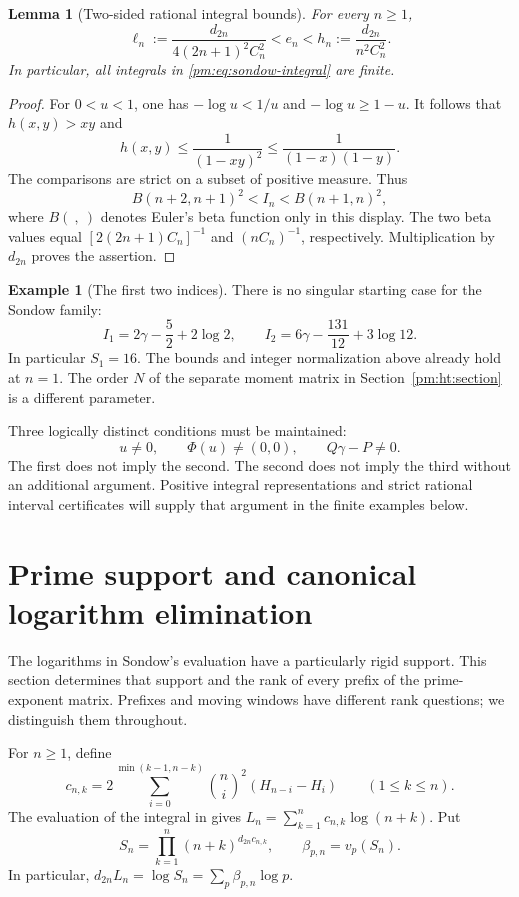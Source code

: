 \documentclass[11pt,a4paper]{article}
\newtheorem{lemma}[theorem]{Lemma}
\theoremstyle{definition}
\newtheorem{example}[theorem]{Example}
\theoremstyle{remark}
\numberwithin{equation}{section}
\begin{document}
\begin{lemma}[Two-sided rational integral bounds]\label{pm:lem:integral-bounds}
For every $n\ge1$,
\begin{equation}\label{pm:eq:two-sided-bounds}
 \ell_n:=\frac{d_{2n}}{4(2n+1)^2C_n^2}
 <e_n<
 h_n:=\frac{d_{2n}}{n^2C_n^2}.
\end{equation}
In particular, all integrals in \eqref{pm:eq:sondow-integral} are finite.
\end{lemma}
\begin{proof}
For $0<u<1$, one has $-\log u<1/u$ and $-\log u\ge1-u$.
It follows that $h(x,y)>xy$ and
\[
 h(x,y)\le\frac1{(1-xy)^2}
 \le\frac1{(1-x)(1-y)}.
\]
The comparisons are strict on a subset of positive measure.  Thus
\[
 B(n+2,n+1)^2<I_n<B(n+1,n)^2,
\]
where $B(\ ,\ )$ denotes Euler's beta function only in this display.
The two beta values equal $[2(2n+1)C_n]^{-1}$ and $(nC_n)^{-1}$,
respectively.  Multiplication by $d_{2n}$ proves the assertion.
\end{proof}

\begin{example}[The first two indices]
There is no singular starting case for the Sondow family:
\[
 I_1=2\gamma-\frac52+2\log2,\qquad
 I_2=6\gamma-\frac{131}{12}+3\log12.
\]
In particular $S_1=16$.  The bounds and integer normalization above
already hold at $n=1$.  The order $N$ of the separate moment matrix in
Section~\ref{pm:ht:section} is a different parameter.
\end{example}

Three logically distinct conditions must be maintained:
\[
 u\ne0,\qquad \Phi(u)\ne(0,0),\qquad Q\gamma-P\ne0.
\]
The first does not imply the second.  The second does not imply the third
without an additional argument.  Positive integral representations and
strict rational interval certificates will supply that argument in the
finite examples below.


\section{Prime support and canonical logarithm elimination}
\label{pm:str:sec-primes}

The logarithms in Sondow's evaluation have a particularly rigid support.
This section determines that support and the rank of every prefix of the
prime-exponent matrix.  Prefixes and moving windows have different rank
questions; we distinguish them throughout.

For $n\geq1$, define
\begin{equation}\label{pm:str:def-c}
 c_{n,k}=2\sum_{i=0}^{\min(k-1,n-k)}
       \binom ni^2(H_{n-i}-H_i)\qquad(1\leq k\leq n).
\end{equation}
The evaluation of the integral in \cite{pm:Sondow2003,pm:SondowZlobin2004}
gives $L_n=\sum_{k=1}^n c_{n,k}\log(n+k)$.  Put
\begin{equation}\label{pm:str:def-S}
 S_n=\prod_{k=1}^n(n+k)^{d_{2n}c_{n,k}},
 \qquad \beta_{p,n}=v_p(S_n).
\end{equation}
In particular, $d_{2n}L_n=\log S_n=\sum_p\beta_{p,n}\log p$.
\end{document}
